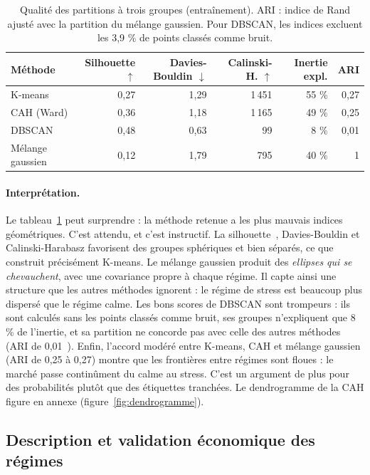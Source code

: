 \begin{table}[!htb]
  \centering
  \small
  \caption{Qualité des partitions à trois groupes (entraînement). ARI : indice de Rand ajusté avec la partition du mélange gaussien. Pour DBSCAN, les indices excluent les 3,9 \% de points classés comme bruit.}
  \label{tab:clustering}
  \begin{tabular}{@{}l r r r r r@{}}
    \toprule
    \textbf{Méthode} & \textbf{Silhouette} $\uparrow$ & \textbf{Davies-Bouldin} $\downarrow$ & \textbf{Calinski-H.} $\uparrow$ & \textbf{Inertie expl.} & \textbf{ARI} \\
    \midrule
    K-means & 0,27 & 1,29 & 1\,451 & 55 \% & 0,27 \\
    CAH (Ward) & 0,36 & 1,18 & 1\,165 & 49 \% & 0,25 \\
    DBSCAN & 0,48 & 0,63 & 99 & 8 \% & 0,01 \\
    Mélange gaussien & 0,12 & 1,79 & 795 & 40 \% & 1 \\
    \bottomrule
  \end{tabular}
\end{table}

\paragraph{Interprétation.} Le tableau~\ref{tab:clustering} peut surprendre : la méthode retenue a les plus mauvais indices géométriques. C'est attendu, et c'est instructif. La silhouette~\cite{rousseeuw1987}, Davies-Bouldin et Calinski-Harabasz favorisent des groupes sphériques et bien séparés, ce que construit précisément K-means. Le mélange gaussien produit des \emph{ellipses qui se chevauchent}, avec une covariance propre à chaque régime. Il capte ainsi une structure que les autres méthodes ignorent : le régime de stress est beaucoup plus dispersé que le régime calme. Les bons scores de DBSCAN sont trompeurs : ils sont calculés sans les points classés comme bruit, ses groupes n'expliquent que 8 \% de l'inertie, et sa partition ne concorde pas avec celle des autres méthodes (ARI de 0,01~\cite{hubert1985}). Enfin, l'accord modéré entre K-means, CAH et mélange gaussien (ARI de 0,25 à 0,27) montre que les frontières entre régimes sont floues : le marché passe continûment du calme au stress. C'est un argument de plus pour des probabilités plutôt que des étiquettes tranchées. Le dendrogramme de la CAH figure en annexe (figure~\ref{fig:dendrogramme}).

\subsection{Description et validation économique des régimes}


